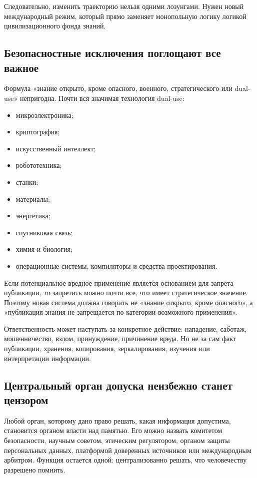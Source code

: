 \documentclass[11pt,a4paper]{article}
\begin{document}
Следовательно, изменить траекторию нельзя одними лозунгами. Нужен новый международный режим, который прямо заменяет монопольную логику логикой цивилизационного фонда знаний.

\subsection{Безопасностные исключения поглощают все важное}

Формула «знание открыто, кроме опасного, военного, стратегического или dual-use» непригодна. Почти вся значимая технология dual-use:

\begin{itemize}
  \item микроэлектроника;
  \item криптография;
  \item искусственный интеллект;
  \item робототехника;
  \item станки;
  \item материалы;
  \item энергетика;
  \item спутниковая связь;
  \item химия и биология;
  \item операционные системы, компиляторы и средства проектирования.
\end{itemize}

Если потенциальное вредное применение является основанием для запрета публикации, то запретить можно почти все, что имеет стратегическое значение. Поэтому новая система должна говорить не «знание открыто, кроме опасного», а «публикация знания не запрещается по категории возможного применения».

Ответственность может наступать за конкретное действие: нападение, саботаж, мошенничество, взлом, принуждение, причинение вреда. Но не за сам факт публикации, хранения, копирования, зеркалирования, изучения или интерпретации информации.

\subsection{Центральный орган допуска неизбежно станет цензором}

Любой орган, которому дано право решать, какая информация допустима, становится органом власти над памятью. Его можно назвать комитетом безопасности, научным советом, этическим регулятором, органом защиты персональных данных, платформой доверенных источников или международным арбитром. Функция остается одной: централизованно решать, что человечеству разрешено помнить.
\end{document}
